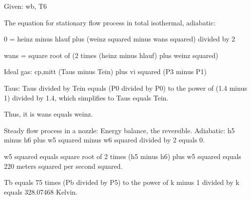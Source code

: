 Given: wb, T6

The equation for stationary flow process in total isothermal, adiabatic:

0 = heinz minus hlauf plus (weinz squared minus wans squared) divided by 2

wans = square root of (2 times (heinz minus hlauf) plus weinz squared)

Ideal gas: cp,mitt (Taus minus Tein) plus vi squared (P3 minus P1)

Taus: Taus divided by Tein equals (P0 divided by P0) to the power of (1.4 minus 1) divided by 1.4, which simplifies to Taus equals Tein.

Thus, it is wans equals weinz.

Steady flow process in a nozzle: Energy balance, the reversible. Adiabatic: h5 minus h6 plus w5 squared minus w6 squared divided by 2 equals 0.

w5 squared equals square root of 2 times (h5 minus h6) plus w5 squared equals 220 meters squared per second squared.

Tb equals 75 times (Pb divided by P5) to the power of k minus 1 divided by k equals 328.07468 Kelvin.